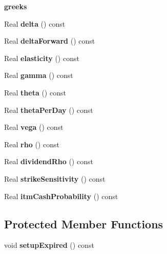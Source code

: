 \begin{Indent}{\bf greeks}\par
\begin{DoxyCompactItemize}
\item 
Real {\bfseries delta} () const \label{class_quant_lib_1_1_one_asset_option_a17265f927ab9be13ce870d9b575c00cb}

\item 
Real {\bfseries delta\+Forward} () const \label{class_quant_lib_1_1_one_asset_option_aec28023b70dfc71f5e6fa9757fd1832a}

\item 
Real {\bfseries elasticity} () const \label{class_quant_lib_1_1_one_asset_option_a6cf7c6562740c85756a144469e2df8da}

\item 
Real {\bfseries gamma} () const \label{class_quant_lib_1_1_one_asset_option_ae566241a75e5f240846a80923c7a2f39}

\item 
Real {\bfseries theta} () const \label{class_quant_lib_1_1_one_asset_option_a56f7387983ab8268b9200421b4f59098}

\item 
Real {\bfseries theta\+Per\+Day} () const \label{class_quant_lib_1_1_one_asset_option_af3a4f561198d53a7f19d738e9ac26821}

\item 
Real {\bfseries vega} () const \label{class_quant_lib_1_1_one_asset_option_a568df2478c8e0e0d3c9c986a30b78a19}

\item 
Real {\bfseries rho} () const \label{class_quant_lib_1_1_one_asset_option_a25563922cbeb5d46886fd5754e6b8edb}

\item 
Real {\bfseries dividend\+Rho} () const \label{class_quant_lib_1_1_one_asset_option_aed6e8c8bdc9ed2aee8415637027861d5}

\item 
Real {\bfseries strike\+Sensitivity} () const \label{class_quant_lib_1_1_one_asset_option_abb3d53a82ea94a1c100cae16bd62097a}

\item 
Real {\bfseries itm\+Cash\+Probability} () const \label{class_quant_lib_1_1_one_asset_option_aeb30bd4f16fda114ed7dca52ac4eada3}

\end{DoxyCompactItemize}
\end{Indent}
\subsection*{Protected Member Functions}
\begin{DoxyCompactItemize}
\item 
void {\bfseries setup\+Expired} () const \label{class_quant_lib_1_1_one_asset_option_aeb1fc193c9e4b91d392b89b8127be11a}

\end{DoxyCompactItemize}
